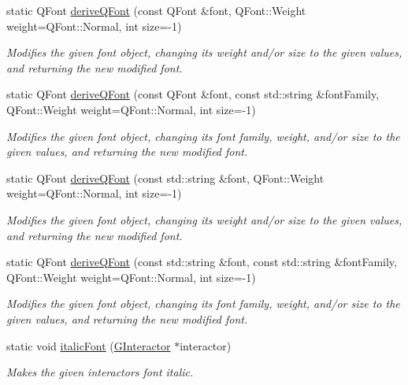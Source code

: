 \begin{DoxyCompactItemize}
static Q\+Font \mbox{\hyperlink{classGFont_ac36fbf8f4ebf4558559f98d54277529f}{derive\+Q\+Font}} (const Q\+Font \&font, Q\+Font\+::\+Weight weight=Q\+Font\+::\+Normal, int size=-\/1)
\begin{DoxyCompactList}\small\item\em Modifies the given font object, changing its weight and/or size to the given values, and returning the new modified font. \end{DoxyCompactList}\item 
static Q\+Font \mbox{\hyperlink{classGFont_aa0a91decdb8d9bec6e875ebac9d81c97}{derive\+Q\+Font}} (const Q\+Font \&font, const std\+::string \&font\+Family, Q\+Font\+::\+Weight weight=Q\+Font\+::\+Normal, int size=-\/1)
\begin{DoxyCompactList}\small\item\em Modifies the given font object, changing its font family, weight, and/or size to the given values, and returning the new modified font. \end{DoxyCompactList}\item 
static Q\+Font \mbox{\hyperlink{classGFont_a6fdde28adfdce9b43b7eb4d4a47ca23b}{derive\+Q\+Font}} (const std\+::string \&font, Q\+Font\+::\+Weight weight=Q\+Font\+::\+Normal, int size=-\/1)
\begin{DoxyCompactList}\small\item\em Modifies the given font object, changing its weight and/or size to the given values, and returning the new modified font. \end{DoxyCompactList}\item 
static Q\+Font \mbox{\hyperlink{classGFont_a50c41ebc7de0a4a038852b0764d3a6f2}{derive\+Q\+Font}} (const std\+::string \&font, const std\+::string \&font\+Family, Q\+Font\+::\+Weight weight=Q\+Font\+::\+Normal, int size=-\/1)
\begin{DoxyCompactList}\small\item\em Modifies the given font object, changing its font family, weight, and/or size to the given values, and returning the new modified font. \end{DoxyCompactList}\item 
static void \mbox{\hyperlink{classGFont_a3f37291f3e288376754c056a10b64f90}{italic\+Font}} (\mbox{\hyperlink{classGInteractor}{G\+Interactor}} $\ast$interactor)
\begin{DoxyCompactList}\small\item\em Makes the given interactor\textquotesingle{}s font italic. \end{DoxyCompactList}\item 

\end{DoxyCompactItemize}

